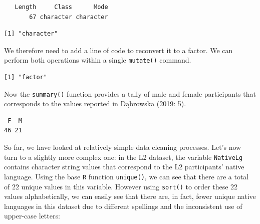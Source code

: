 \documentclass[
  letterpaper,
  DIV=11,
  numbers=noendperiod]{scrreprt}
\newenvironment{Shaded}{\begin{snugshade}}{\end{snugshade}}
\newcommand{\AttributeTok}[1]{\textcolor[rgb]{0.40,0.45,0.13}{#1}}
\newcommand{\FunctionTok}[1]{\textcolor[rgb]{0.28,0.35,0.67}{#1}}
\newcommand{\NormalTok}[1]{\textcolor[rgb]{0.00,0.23,0.31}{#1}}
\newcommand{\OtherTok}[1]{\textcolor[rgb]{0.00,0.23,0.31}{#1}}
\newcommand{\SpecialCharTok}[1]{\textcolor[rgb]{0.37,0.37,0.37}{#1}}
\begin{document}
\begin{verbatim}
   Length     Class      Mode 
       67 character character 
\end{verbatim}

\begin{Shaded}
\end{Shaded}

\begin{verbatim}
[1] "character"
\end{verbatim}

We therefore need to add a line of code to reconvert it to a factor. We
can perform both operations within a single \texttt{mutate()} command.

\begin{Shaded}
\end{Shaded}

\begin{verbatim}
[1] "factor"
\end{verbatim}

Now the \texttt{summary()} function provides a tally of male and female
participants that corresponds to the values reported in Dąbrowska (2019:
5).

\begin{Shaded}
\end{Shaded}

\begin{verbatim}
 F  M 
46 21 
\end{verbatim}

So far, we have looked at relatively simple data cleaning processes.
Let's now turn to a slightly more complex one: in the L2 dataset, the
variable \texttt{NativeLg} contains character string values that
correspond to the L2 participants' native language. Using the base
\texttt{R} function \texttt{unique()}, we can see that there are a total
of 22 unique values in this variable. However using \texttt{sort()} to
order these 22 values alphabetically, we can easily see that there are,
in fact, fewer unique native languages in this dataset due to different
spellings and the inconsistent use of upper-case letters:
\end{document}
